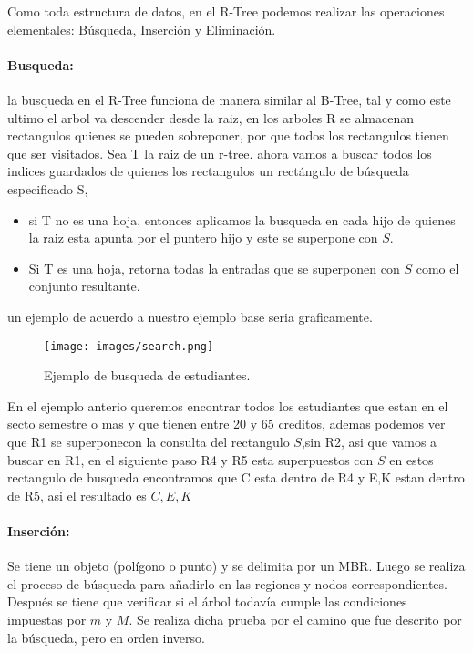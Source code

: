 \documentclass[12pt]{article}
\begin{document}
Como toda estructura de datos, en el R-Tree podemos realizar las operaciones elementales: Búsqueda, Inserción y Eliminación.

\paragraph{Busqueda:} la busqueda en el R-Tree funciona de manera similar al B-Tree, tal y como este ultimo el arbol va descender desde la raiz, en los arboles R se almacenan rectangulos quienes se pueden sobreponer, por que todos los rectangulos tienen que ser visitados.
Sea T la raiz de un r-tree. ahora vamos a buscar todos los indices guardados de quienes los rectangulos un rectángulo de búsqueda especificado S,
\begin{itemize}
    \item si T no es una hoja, entonces aplicamos la busqueda en cada hijo de quienes la raiz esta apunta por el puntero hijo y este se superpone con $S$.
    \item Si T es una hoja, retorna todas la entradas que se superponen con $S$ como el conjunto resultante.
\end{itemize}

un ejemplo de acuerdo a nuestro ejemplo base seria graficamente.

\begin{figure}[!h]
\centering
\texttt{[image: images/search.png]}
\centering
\caption{Ejemplo de busqueda de estudiantes.}
\end{figure}

En el ejemplo anterio queremos encontrar todos los estudiantes que estan en el secto semestre o mas y que tienen entre 20 y 65 creditos, ademas podemos ver que R1 se superponecon la consulta del rectangulo $S$,sin R2, asi que vamos a buscar en R1, en el siguiente paso R4 y R5 esta superpuestos con $S$ en estos rectangulo de busqueda encontramos que C esta dentro de R4 y E,K estan dentro de R5, asi el resultado es ${C,E,K}$

\paragraph{Inserción:} Se tiene un objeto (polígono o punto) y se delimita por un MBR. Luego se realiza el proceso de búsqueda para añadirlo en las regiones y nodos correspondientes. Después se tiene que verificar si el árbol todavía cumple las condiciones impuestas por $m$ y $M$. Se realiza dicha prueba por el camino que fue descrito por la búsqueda, pero en orden inverso.
\end{document}
